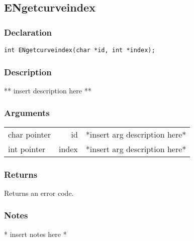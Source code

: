 \subsection{ENgetcurveindex}
\subsubsection{Declaration}
\begin{lstlisting}
int ENgetcurveindex(char *id, int *index);
\end{lstlisting}
\subsubsection{Description}
** insert description here **
\subsubsection{Arguments}
\begin{tabular}{l r p{11cm} }
char pointer&id&*insert arg description here* \\[6pt]
int pointer&index&*insert arg description here* \\[6pt]
\end{tabular}
\subsubsection{Returns}
Returns an error code.
\subsubsection{Notes}
* insert notes here *
